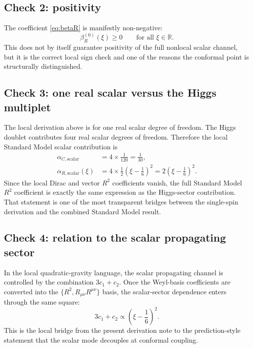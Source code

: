 \documentclass[11pt,a4paper]{article}
\newcommand{\Ricsq}{R_{\mu\nu}R^{\mu\nu}}
\theoremstyle{definition}
\theoremstyle{remark}
\begin{document}
\subsection{Check 2: positivity}

The coefficient \eqref{eq:betaR} is manifestly non-negative:
\begin{equation}
  \beta_R^{(0)}(\xi) \geq 0
  \qquad\text{for all } \xi \in \mathbb R.
  \label{eq:positivity}
\end{equation}
This does not by itself guarantee positivity of the full nonlocal scalar
channel, but it is the correct local sign check and one of the reasons the
conformal point is structurally distinguished.

\subsection{Check 3: one real scalar versus the Higgs multiplet}

The local derivation above is for one real scalar degree of freedom.  The
Higgs doublet contributes four real scalar degrees of freedom.  Therefore the
local Standard Model scalar contribution is
\begin{align}
  \alpha_{C,\mathrm{scalar}}
  &= 4\times \frac{1}{120}
   = \frac{1}{30},
  \label{eq:alphaC-scalar-sector}\\[4pt]
  \alpha_{R,\mathrm{scalar}}(\xi)
  &= 4\times \frac{1}{2}\left(\xi-\frac{1}{6}\right)^2
   = 2\left(\xi-\frac{1}{6}\right)^2.
  \label{eq:alphaR-scalar-sector}
\end{align}
Since the local Dirac and vector $R^2$ coefficients vanish, the full Standard
Model $R^2$ coefficient is exactly the same expression as the Higgs-sector
contribution.  That statement is one of the most transparent bridges between
the single-spin derivation and the combined Standard Model result.

\subsection{Check 4: relation to the scalar propagating sector}

In the local quadratic-gravity language, the scalar propagating channel is
controlled by the combination $3c_1+c_2$.  Once the Weyl-basis coefficients
are converted into the $\{R^2,\Ricsq\}$ basis, the scalar-sector dependence
enters through the same square:
\begin{equation}
  3c_1 + c_2
  \propto \left(\xi - \frac{1}{6}\right)^2.
  \label{eq:3c1c2-bridge}
\end{equation}
This is the local bridge from the present derivation note to the
prediction-style statement that the scalar mode decouples at conformal
coupling.
\end{document}
